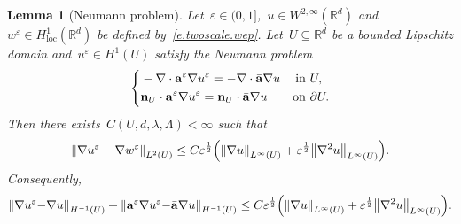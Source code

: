 \documentclass[11pt,twoside]{article} %
\numberwithin{equation}{section}
\newtheorem{lemma}[theorem]{Lemma}
\theoremstyle{definition}
\let\originalleft\left
\let\originalright\right
\renewcommand{\left}{\mathopen{}\mathclose\bgroup\originalleft}
\renewcommand{\right}{\aftergroup\egroup\originalright}
\newcommand*{\Rd}{\ensuremath{\mathbb{R}^d}}
\newcommand{\eps}{\varepsilon}
\newcommand{\ep}{\eps}
\renewcommand{\a}{\mathbf{a}}
\newcommand{\ahom}{\bar{\a}}
\begin{document}
\begin{lemma}[Neumann problem]
\label{l.NP.2infty}
Let~$\ep\in (0,1]$,~$u\in W^{2,\infty}(\Rd)$ and~$w^\ep\in H^1_{\mathrm{loc}}(\Rd)$ be defined by~\eqref{e.twoscale.wep}. Let~$U\subseteq\Rd$ be a bounded Lipschitz domain and~$u^\ep \in H^1(U)$ satisfy the Neumann problem 
\begin{align}
\label{e.eq.NP.2infty}
\left\{
\begin{aligned}
& -\nabla \cdot \a^\ep \nabla u^\ep = - \nabla \cdot \ahom\nabla u & \mbox{in} & \ U, 
\\
& \mathbf{n}_{U} \cdot \a^\ep \nabla u^\ep = \mathbf{n}_{U} \cdot \ahom\nabla u & \mbox{on} & \ \partial U. 
\end{aligned}
\right.
\end{align}
Then there exists~$C(U,d,\lambda,\Lambda)<\infty$ such that 
\begin{equation}
\label{e.ee.easy.NP}
\left\| \nabla u^\ep - \nabla w^\ep \right\|_{{L}^2(U)} 
\leq
C \ep^{\frac12} \left(  \left\| \nabla u \right\|_{L^\infty(U)}
+
\ep^{\frac12} \left\| \nabla^2 u \right\|_{L^\infty(U)}
\right).
\end{equation}
Consequently, 
\begin{equation}
\label{e.ee.easy2.NP}
\left\| 
\nabla u^\ep {-} \nabla u \right\|_{H^{-1}(U)} 
+
\left\| 
\a^\ep \nabla u^\ep{ -} \ahom \nabla u \right\|_{H^{-1}(U)}
\leq 
C \ep^{\frac12} \left(  \left\| \nabla u \right\|_{L^\infty(U)}
+
\ep^{\frac12} \left\| \nabla^2 u \right\|_{L^\infty(U)}
\right).
\end{equation}
\end{lemma}
\end{document}
